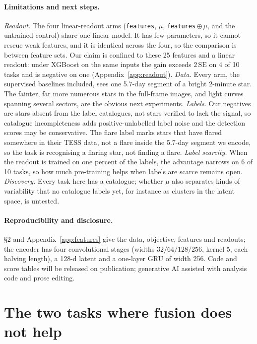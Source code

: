 \documentclass{article}
\begin{document}
\paragraph{\textbf{Limitations and next steps.}} \emph{Readout.} The four linear-readout arms (\texttt{features},
$\mu$, \texttt{features}\,$\oplus\,\mu$, and the untrained control) share one linear model. It has few
parameters, so it cannot rescue weak features, and it is identical across the four, so the comparison
is between feature sets. Our claim is confined to these 25 features and a linear readout: under
XGBoost on the same inputs the gain exceeds $2\,\mathrm{SE}$ on 4 of 10 tasks and is negative on one
(Appendix~\ref{app:readout}). \emph{Data.} Every arm,
the supervised baselines included, sees one 5.7-day segment of a bright 2-minute star. The fainter,
far more numerous stars in the full-frame images, and light curves spanning several sectors, are the
obvious next experiments. \emph{Labels.} Our
negatives are stars absent from the label catalogues, not stars verified to lack the signal, so
catalogue incompleteness adds positive-unlabelled label noise and the detection scores may be
conservative. The flare label marks stars that have flared somewhere in their TESS data, not a flare inside
the 5.7-day segment we encode, so the task is recognising a flaring star, not finding a flare. \emph{Label scarcity.} When
the readout is trained on one percent of the labels, the advantage narrows on 6 of 10 tasks, so how
much pre-training helps when labels are scarce remains open. \emph{Discovery.} Every task here has a
catalogue; whether $\mu$ also separates kinds of variability that no catalogue labels yet, for instance
as clusters in the latent space, is untested.

\paragraph{Reproducibility and disclosure.} \S2 and Appendix~\ref{app:features} give the data,
objective, features and readouts; the encoder has four convolutional stages (widths $32/64/128/256$,
kernel 5, each halving length), a 128-d latent and a one-layer GRU of width 256. Code and score
tables will be released on publication; generative AI assisted with analysis code and prose editing.

\raggedbottom



\appendix

\section{The two tasks where fusion does not help}
\label{app:negatives}
\end{document}
